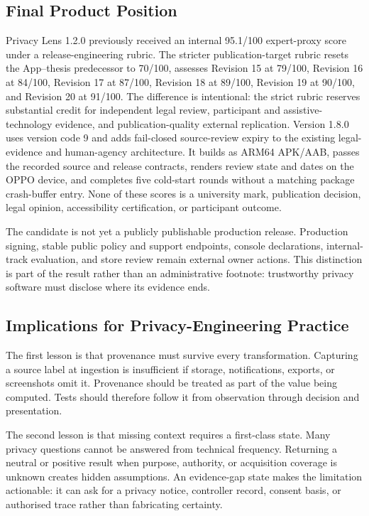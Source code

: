 \subsection{Final Product Position}

Privacy Lens 1.2.0 previously received an internal 95.1/100 expert-proxy score under a release-engineering rubric. The stricter publication-target rubric resets the App--thesis predecessor to 70/100, assesses Revision 15 at 79/100, Revision 16 at 84/100, Revision 17 at 87/100, Revision 18 at 89/100, Revision 19 at 90/100, and Revision 20 at 91/100. The difference is intentional: the strict rubric reserves substantial credit for independent legal review, participant and assistive-technology evidence, and publication-quality external replication. Version 1.8.0 uses version code 9 and adds fail-closed source-review expiry to the existing legal-evidence and human-agency architecture. It builds as ARM64 APK/AAB, passes the recorded source and release contracts, renders review state and dates on the OPPO device, and completes five cold-start rounds without a matching package crash-buffer entry. None of these scores is a university mark, publication decision, legal opinion, accessibility certification, or participant outcome.

The candidate is not yet a publicly publishable production release. Production signing, stable public policy and support endpoints, console declarations, internal-track evaluation, and store review remain external owner actions. This distinction is part of the result rather than an administrative footnote: trustworthy privacy software must disclose where its evidence ends.

\subsection{Implications for Privacy-Engineering Practice}

The first lesson is that provenance must survive every transformation. Capturing a source label at ingestion is insufficient if storage, notifications, exports, or screenshots omit it. Provenance should be treated as part of the value being computed. Tests should therefore follow it from observation through decision and presentation.

The second lesson is that missing context requires a first-class state. Many privacy questions cannot be answered from technical frequency. Returning a neutral or positive result when purpose, authority, or acquisition coverage is unknown creates hidden assumptions. An evidence-gap state makes the limitation actionable: it can ask for a privacy notice, controller record, consent basis, or authorised trace rather than fabricating certainty.

